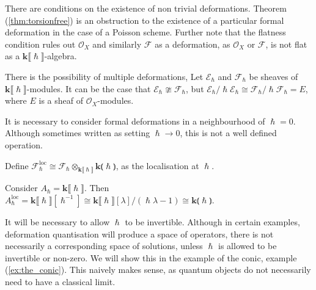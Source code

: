     There are conditions on the existence of non trivial deformations. Theorem (\ref{thm:torsionfree}) is an obstruction to the existence of a particular formal deformation in the case of a Poisson scheme. Further note that the flatness condition rules out \( \mathcal{O}_X\) and similarly \( \mathcal{F}\) as a deformation, as \( \mathcal{O}_X\) or \( \mathcal{F}\), is not flat as a \( \mathbf{k}\lBrack \hslash\rBrack\)-algebra.

    There is the possibility of multiple deformations, Let \( \mathcal{E}_\hslash \) and \( \mathcal{F}_\hslash\) be sheaves of  \(  \mathbf{k}\lBrack\hslash\rBrack\)-modules. It can be the case that \( \mathcal{E}_\hslash \ncong \mathcal{F}_\hslash\), but \( \mathcal{E}_\hslash/ \hslash \mathcal{E}_{\hslash} \cong \mathcal{F}_\hslash/ \hslash \mathcal{F}_{\hslash} = E\), where \( E \) is a sheaf of \( \mathcal{O}_X\)-modules.

    
 
    It is necessary to consider formal deformations in a neighbourhood of \(\hslash = 0\). Although sometimes written as setting \(\hslash\rightarrow 0\), this is not a well defined operation.
    
    \begin{defn}[Localisation] Define \( \mathcal{F}_{\hslash}^{\mathrm{loc}} \cong \mathcal{F}_{\hslash} \otimes_{\mathbf{k}\lBrack \hslash \rBrack} \mathbf{k} \lParen \hslash \rParen\), as the localisation at \( \hslash\).
    \end{defn}
    
    \begin{ex}Consider \( A_{\hslash} = \mathbf{k} \lBrack \hslash \rBrack\). Then
    \(A^{\mathrm{loc}}_{\hslash} = \mathbf{k}\lBrack \hslash \rBrack [  \hslash^{-1} ] \cong \mathbf{k} \lBrack \hslash \rBrack  [\lambda ] / ( \hslash \lambda - 1) \cong \mathbf{k} \lParen \hslash \rParen \).
    \end{ex}    
    
    It will be necessary to allow \(\hslash\) to be invertible. Although in certain examples, deformation quantisation will produce a space of operators, there is not necessarily a corresponding space of solutions, unless \(\hslash\) is allowed to be invertible or non-zero. We will show this in the example of the conic, example (\ref{ex:the_conic}). This naively makes sense, as quantum objects do not necessarily need to have a classical limit.
    
